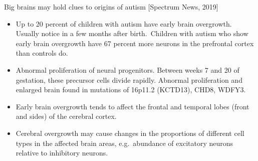 \documentclass{report}
\begin{document}
Big brains may hold clues to origins of autism [Spectrum News, 2019]
\begin{itemize}
	\item Up to 20 percent of children with autism have early brain overgrowth. Usually notice in a few months after birth. Children with autism who show early brain overgrowth have 67 percent more neurons in the prefrontal cortex than controls do.
	
	\item Abnormal proliferation of neural progenitors. Between weeks 7 and 20 of gestation, these precursor cells divide rapidly. Abnormal proliferation and enlarged brain found in mutations of 16p11.2 (KCTD13), CHD8, WDFY3.
	
	\item Early brain overgrowth tends to affect the frontal and temporal lobes (front and sides) of the cerebral cortex.
	
	\item Cerebral overgrowth may cause changes in the proportions of different cell types in the affected brain areas, e.g. abundance of excitatory neurons relative to inhibitory neurons.
\end{itemize}
\end{document}

